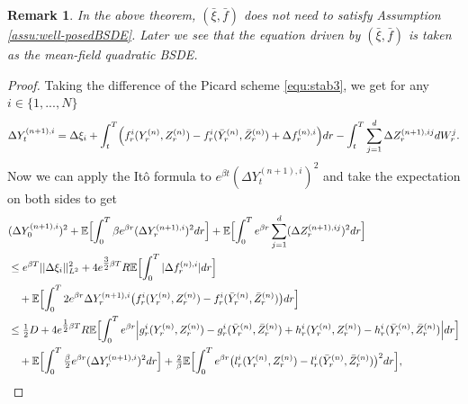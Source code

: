 \documentclass[10pt,a4paper]{article}
\theoremstyle{plain}
\newtheorem{Remark}[Theorem]{Remark}
\theoremstyle{definition}
\numberwithin{equation}{section}
\begin{document}
\begin{Remark}
   In the above theorem, $(\bar \xi, \bar f)$ does not need to satisfy Assumption \ref{assu:well-posedBSDE}. Later we see that the equation driven by $(\bar \xi, \bar f)$ is taken as the mean-field quadratic BSDE.
\end{Remark}

\begin{proof}
Taking the difference of the Picard scheme \eqref{equ:stab3}, we get for any $i \in \{1,...,N\}$
\begin{equation}
\label{equ:stab6}
\Delta Y_{t}^{(n+1),i} = \Delta \xi_{i} + \int_{t}^{T}\Bigl(f_{r}^{i}(Y_{r}^{(n)},Z_{r}^{(n)})-f_{r}^{i}(\bar{Y}_{r}^{(n)},\bar{Z}_{r}^{(n)}) + \Delta f_{r}^{(n),i}\Bigr)dr - \int_{t}^{T}\sum_{j=1}^{d}\Delta Z_{r}^{(n+1),ij}dW_{r}^{j}.
\end{equation}
Now we can apply the Itô formula to $e^{\beta t}(\Delta Y_{t}^{(n+1),i})^{2}$ and take the expectation on both sides to get
\begin{align}
&(\Delta Y_{0}^{(n+1),i})^{2} + \mathbb{E}\Bigl[\int_{0}^{T}\beta e^{\beta r}(\Delta Y_{r}^{(n+1),i})^{2}dr\Bigr] + \mathbb{E}\Bigl[\int_{0}^{T}e^{\beta r} \sum_{j=1}^{d}(\Delta Z_{r}^{(n+1),ij})^{2}dr\Bigr] \nonumber \\
&\leq e^{\beta T}||\Delta \xi_{i}||_{L^{2}}^{2} +4e^{\tfrac{3}{2}\beta T}R\mathbb{E}\Bigl[\int_{0}^{T}|\Delta f_{r}^{(n),i}|dr\Bigr] \nonumber \\
&\ \ \ + \mathbb{E}\Bigl[\int_{0}^{T}2e^{\beta r}\Delta Y_{r}^{(n+1),i}\bigl(f_{r}^{i}(Y_{r}^{(n)},Z_{r}^{(n)})-f_{r}^{i}(\bar{Y}_{r}^{(n)},\bar{Z}_{r}^{(n)})\bigr)dr\Bigr] \nonumber \\
&\leq \tfrac{1}{2}D + 4e^{\tfrac{1}{2}\beta T}R\mathbb{E}\Bigl[\int_{0}^{T}e^{\beta r}\Bigl|g_{r}^{i}(Y_{r}^{(n)},Z_{r}^{(n)})-g_{r}^{i}(\bar{Y}_{r}^{(n)},\bar{Z}_{r}^{(n)}) + h_{r}^{i}(Y_{r}^{(n)},Z_{r}^{(n)})-h_{r}^{i}(\bar{Y}_{r}^{(n)},\bar{Z}_{r}^{(n)})\Bigr|dr\Bigr] \nonumber \\
&\ \ \ + \mathbb{E}\Bigl[\int_{0}^{T}\tfrac{\beta}{2}e^{\beta r}(\Delta Y_{r}^{(n+1),i})^{2}dr\Bigr] + \tfrac{2}{\beta}\mathbb{E}\Bigl[\int_{0}^{T}e^{\beta r}\bigl(l_{r}^{i}(Y_{r}^{(n)},Z_{r}^{(n)})-l_{r}^{i}(\bar{Y}_{r}^{(n)},\bar{Z}_{r}^{(n)})\bigr)^{2}dr\Bigr], \label{equ:stab7}

\end{align}
\end{proof}
\end{document}

